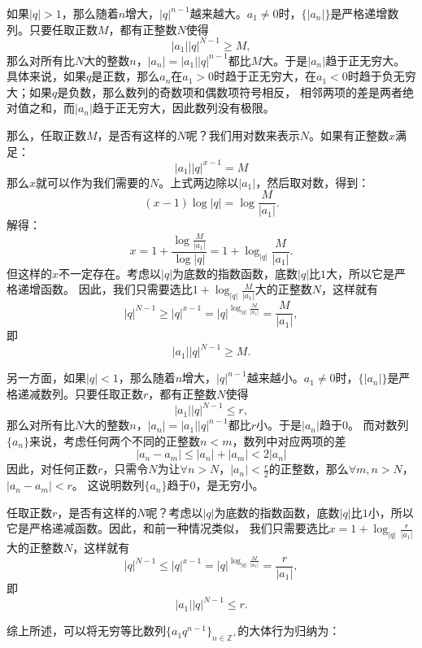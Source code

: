 \documentclass[12pt,UTF8]{ctexbook}
\begin{document}
如果$|q| > 1$，那么随着$n$增大，$|q|^{n-1}$越来越大。$a_1 \neq 0$时，$\{|a_n|\}$是严格递增数列。只要任取正数$M$，都有正整数$N$使得
$$ |a_1||q|^{N-1} \geqslant M,$$
那么对所有比$N$大的整数$n$，$|a_n| = |a_1||q|^{n-1}$都比$M$大。于是$|a_n|$趋于正无穷大。
具体来说，如果$q$是正数，那么$a_n$在$a_1>0$时趋于正无穷大，在$a_1<0$时趋于负无穷大；如果$q$是负数，那么数列的奇数项和偶数项符号相反，
相邻两项的差是两者绝对值之和，而$|a_n|$趋于正无穷大，因此数列没有极限。

那么，任取正数$M$，是否有这样的$N$呢？我们用对数来表示$N$。如果有正整数$x$满足：
$$ |a_1||q|^{x-1} = M $$
那么$x$就可以作为我们需要的$N$。上式两边除以$|a_1|$，然后取对数，得到：
$$ (x - 1)\log{|q|} = \log{\frac{M}{|a_1|}}. $$
解得：
$$ x = 1 + \frac{\log{\frac{M}{|a_1|}}}{\log{|q|}} = 1 + \log_{|q|}{\frac{M}{|a_1|}}. $$
但这样的$x$不一定存在。考虑以$|q|$为底数的指数函数，底数$|q|$比$1$大，所以它是严格递增函数。
因此，我们只需要选比$1 + \log_{|q|}{\frac{M}{|a_1|}}$大的正整数$N$，这样就有
$$ |q|^{N-1} \geqslant |q|^{x-1} = |q|^{\log_{|q|}{\frac{M}{|a_1|}}} = \frac{M}{|a_1|},$$
即
$$ |a_1||q|^{N-1} \geqslant M.$$

另一方面，如果$|q| < 1$，那么随着$n$增大，$|q|^{n-1}$越来越小。$a_1 \neq 0$时，$\{|a_n|\}$是严格递减数列。只要任取正数$r$，都有正整数$N$使得
$$ |a_1||q|^{N-1} \leqslant r,$$
那么对所有比$N$大的整数$n$，$|a_n| = |a_1||q|^{n-1}$都比$r$小。于是$|a_n|$趋于$0$。
而对数列$\{a_n\}$来说，考虑任何两个不同的正整数$n<m$，数列中对应两项的差
$$ |a_n - a_m| \leqslant |a_n| + |a_m| < 2|a_n|$$
因此，对任何正数$r$，只需令$N$为让$\forall n > N$，$|a_n| < \frac{r}{2}$的正整数，那么$\forall m, n > N$，$|a_n - a_m| < r$。
这说明数列$\{a_n\}$趋于$0$，是无穷小。

任取正数$r$，是否有这样的$N$呢？考虑以$|q|$为底数的指数函数，底数$|q|$比$1$小，所以它是严格递减函数。因此，和前一种情况类似，
我们只需要选比$x = 1 + \log_{|q|}{\frac{r}{|a_1|}}$大的正整数$N$，这样就有
$$ |q|^{N-1} \leqslant |q|^{x-1} = |q|^{\log_{|q|}{\frac{M}{|a_1|}}} = \frac{r}{|a_1|},$$
即
$$ |a_1||q|^{N-1} \leqslant r.$$

综上所述，可以将无穷等比数列$\{a_1 q^{n-1}\}_{n\in\mathbb{Z}^+}$的大体行为归纳为：

\begin{center}
\end{center}
\end{document}
